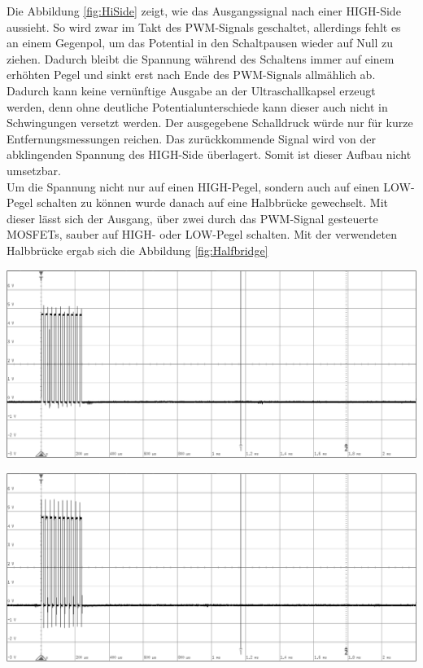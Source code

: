Die Abbildung \ref{fig:HiSide} zeigt, wie das Ausgangssignal nach einer HIGH-Side aussieht. So wird zwar im Takt des PWM-Signals geschaltet, allerdings fehlt es an einem Gegenpol, um das Potential in den Schaltpausen wieder auf Null zu ziehen. Dadurch bleibt die Spannung während des Schaltens immer auf einem erhöhten Pegel und sinkt erst nach Ende des PWM-Signals allmählich ab. Dadurch kann keine vernünftige Ausgabe an der Ultraschallkapsel erzeugt werden, denn ohne deutliche Potentialunterschiede kann dieser auch nicht in Schwingungen versetzt werden. Der ausgegebene Schalldruck würde nur für kurze Entfernungsmessungen reichen. Das zurückkommende Signal wird von der abklingenden Spannung des HIGH-Side überlagert. Somit ist dieser Aufbau nicht umsetzbar.\\
Um die Spannung nicht nur auf einen HIGH-Pegel, sondern auch auf einen LOW-Pegel schalten zu können wurde danach auf eine Halbbrücke gewechselt. Mit dieser lässt sich der Ausgang, über zwei durch das PWM-Signal gesteuerte MOSFETs, sauber auf HIGH- oder LOW-Pegel schalten. 
Mit der verwendeten Halbbrücke ergab sich die Abbildung \ref{fig:Halfbridge}\\
\begin{minipage}{0.46\textwidth}
\includegraphics[width=1\textwidth%
]{Abbildungen/MessungenP1/PWM-Nach-der-Halbbrucke.png}
\label{fig:Halfbridge}
\end{minipage}\qquad
\begin{minipage}{0.46\textwidth}
\includegraphics[width=1\textwidth%
]{Abbildungen/MessungenP1/PWM-Nach-der-Halbbrucke-mit-LS.png}
\label{fig:Senderausgabe}
\end{minipage}\\
